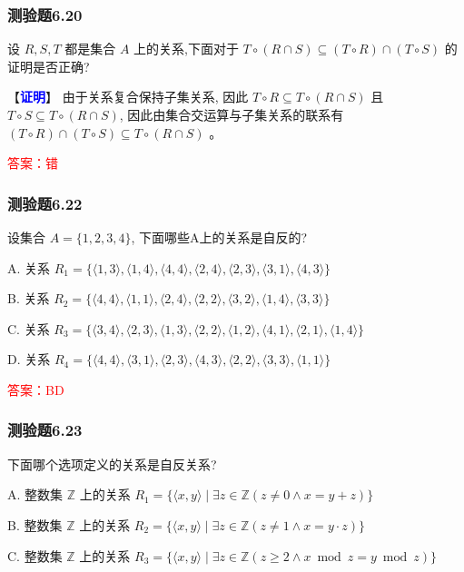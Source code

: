\documentclass[UTF8, heading=true]{ctexart}
\begin{document}
\subsubsection{测验题6.20}
设 $R, S, T$ 都是集合 $A$ 上的关系,下面对于 $T \circ(R \cap S) \subseteq(T \circ R) \cap(T \circ S)$ 的证明是否正确?

【\textcolor{blue}{\textbf{证明}}】 由于关系复合保持子集关系, 因此 $T \circ R \subseteq T \circ(R \cap S)$ 且 $T \circ S \subseteq T \circ(R \cap S)$, 因此由集合交运算与子集关系的联系有 $(T \circ R) \cap(T \circ S) \subseteq T \circ(R \cap S)$ 。

\textcolor{red}{答案：错}

\subsubsection{测验题6.22}

设集合 $A=\{1,2,3,4\}$, 下面哪些A上的关系是自反的?

A. 关系 $R_1=\{\langle 1,3\rangle,\langle 1,4\rangle,\langle 4,4\rangle,\langle 2,4\rangle,\langle 2,3\rangle,\langle 3,1\rangle,\langle 4,3\rangle\}$

B. 关系 $R_2=\{\langle 4,4\rangle,\langle 1,1\rangle,\langle 2,4\rangle,\langle 2,2\rangle,\langle 3,2\rangle,\langle 1,4\rangle,\langle 3,3\rangle\}$

C. 关系 $R_3=\{\langle 3,4\rangle,\langle 2,3\rangle,\langle 1,3\rangle,\langle 2,2\rangle,\langle 1,2\rangle,\langle 4,1\rangle,\langle 2,1\rangle,\langle 1,4\rangle\}$

D. 关系 $R_4=\{\langle 4,4\rangle,\langle 3,1\rangle,\langle 2,3\rangle,\langle 4,3\rangle,\langle 2,2\rangle,\langle 3,3\rangle,\langle 1,1\rangle\}$

\textcolor{red}{答案：BD}

\subsubsection{测验题6.23}
下面哪个选项定义的关系是自反关系?

A. 
整数集 $\mathbb{Z}$ 上的关系 $R_1=\{\langle x, y\rangle \mid \exists z \in \mathbb{Z}(z \neq 0 \wedge x=y+z)\}$

B. 
整数集 $\mathbb{Z}$ 上的关系 $R_2=\{\langle x, y\rangle \mid \exists z \in \mathbb{Z}(z \neq 1 \wedge x=y \cdot z)\}$

C. 
整数集 $\mathbb{Z}$ 上的关系 $R_3=\{\langle x, y\rangle \mid \exists z \in \mathbb{Z}(z \geq 2 \wedge x \bmod z=y \bmod z)\}$
\end{document}
